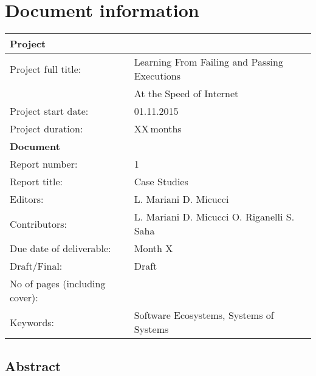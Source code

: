 \documentclass[a4paper,oneside]{scrreprt}
\begin{document}
\maketitle
\chapter*{Document information}\label{docInfo}
 \begin{tabular}[t]{|l|l|}
   \hline
   \multicolumn{2}{|l|}{\bf Project} \\ \hline
   Project full title: & Learning From Failing and Passing Executions\\ 
    &  At the Speed of Internet\\ \hline
   Project start date: & 01.11.2015 \\ \hline
   Project duration: & XX\,months \\ \hline

   \multicolumn{2}{|l|}{\bf Document} \\ \hline
   Report number: & 1\\ \hline
   Report title: & Case Studies\\ \hline
   Editors: & L. Mariani D. Micucci \\ \hline
   Contributors: & L. Mariani  D. Micucci O. Riganelli S. Saha \\ \hline
   Due date of deliverable: & Month X\\ \hline
   Draft/Final: & Draft\\ \hline
   No of pages (including cover): & \pageref{LastPage} \\ \hline
   Keywords: & Software Ecosystems, Systems of Systems\\ \hline
\end{tabular}
\newpage
\section*{Abstract}


\begin{versionhistory}  

 
\end{versionhistory}


\tableofcontents
\cleardoublepage











\end{document}
